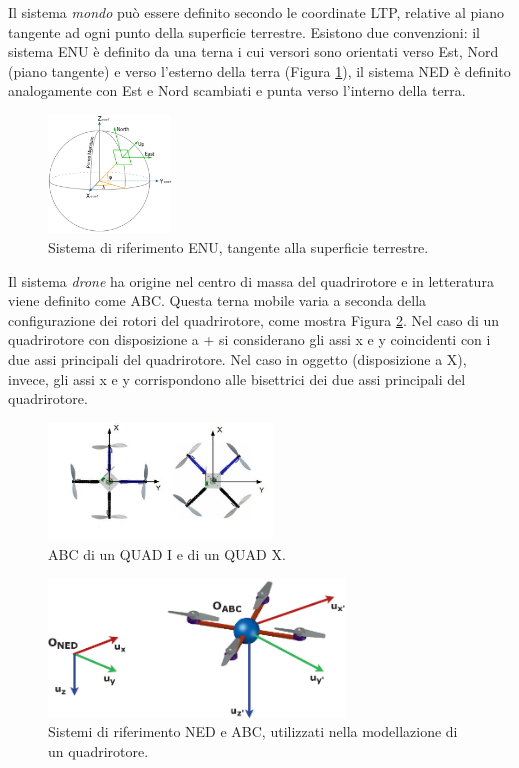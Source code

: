 Il sistema \emph{mondo} può essere definito secondo le coordinate \ac{LTP}, relative al piano tangente ad ogni punto della superficie terrestre. Esistono due convenzioni: il sistema \ac{ENU} è definito da una terna i cui versori sono orientati verso Est, Nord (piano tangente) e verso l'esterno della terra (Figura \ref{fig:fixedRef}), il sistema \ac{NED} è definito analogamente con Est e Nord scambiati e punta verso l'interno della terra.

\begin{figure}[H]
    \centering
    \includegraphics[width=0.29\textwidth]{gfx/ltp_enu}
    \caption[Sistema di riferimento \acs{ENU}.]{Sistema di riferimento \acs{ENU}, tangente alla superficie terrestre.}
    \label{fig:fixedRef}
\end{figure}

Il sistema \emph{drone} ha origine nel centro di massa del quadrirotore e in letteratura viene definito come \ac{ABC}. Questa terna mobile varia a seconda della configurazione dei rotori del quadrirotore, come mostra Figura \ref{fig:+andx}. Nel caso di un quadrirotore con disposizione a + si considerano gli assi x e y coincidenti con i due assi principali del quadrirotore. Nel caso in oggetto (disposizione a X), invece, gli assi x e y corrispondono alle bisettrici dei due assi principali del quadrirotore.

\begin{figure}[H]
    \centering
    \includegraphics[width=0.53\textwidth]{gfx/+andx}
    \caption[\acs{ABC} di un QUAD I e di un QUAD X.]{\acs{ABC} di un QUAD I e di un QUAD X.}
    \label{fig:+andx}
\end{figure}

\begin{figure}[H]
    \centering
    \includegraphics[width=0.7\textwidth]{gfx/abc_frame}
    \caption[Sistemi di riferimento \acs{NED} e \acs{ABC}.]{Sistemi di riferimento \acs{NED} e \acs{ABC}, utilizzati nella modellazione di un quadrirotore.}
    \label{fig:abc_frame}
\end{figure}

